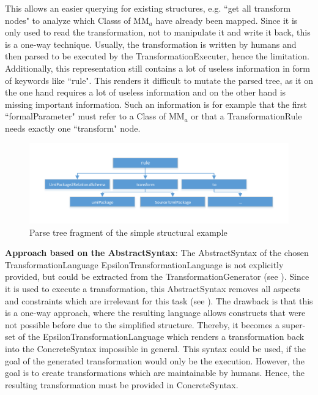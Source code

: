 This allows an easier querying for existing structures, e.g. ``get all transform nodes" to analyze which \glspl{Class} of MM$_a$ have already been mapped. Since it is only used to read the transformation, not to manipulate it and write it back, this is a one-way technique. Usually, the transformation is written by humans and then parsed to be executed by the \gls{TransformationExecuter}, hence the limitation. Additionally, this representation still contains a lot of useless information in form of keywords like ``rule". This renders it difficult to mutate the parsed tree, as it on the one hand requires a lot of useless information and on the other hand is missing important information. Such an information is for example that the first ``formalParameter" must refer to a \gls{Class} of MM$_a$ or that a \gls{TransformationRule} needs exactly one ``transform" node. %

\begin{figure}[htb]
	\centering
	\includegraphics[scale=0.8]{Images/EtlExampleParseTree.pdf} 
	\caption{Parse tree fragment of the simple structural example}
	\label{figEtlExampleParseTree}
\end{figure}

\textbf{Approach based on the \gls{AbstractSyntax}}: The \gls{AbstractSyntax} of the chosen \gls{TransformationLanguage} \gls{EpsilonTransformationLanguage} is not explicitly provided, but could be extracted from the \gls{TransformationGenerator} (see \cite{EclipseFoundation2014}). Since it is used to execute a transformation, this \gls{AbstractSyntax} removes all aspects and constraints which are irrelevant for this task (see \cite{Bendersky2009}). The drawback is that this is a one-way approach, where the resulting language allows constructs that were not possible before due to the simplified structure. Thereby, it becomes a super-set of the \gls{EpsilonTransformationLanguage} which renders a transformation back into the \gls{ConcreteSyntax} impossible in general. This syntax could be used, if the goal of the generated transformation would only be the execution. However, the goal is to create transformations which are maintainable by humans. Hence, the resulting transformation must be provided in \gls{ConcreteSyntax}.

